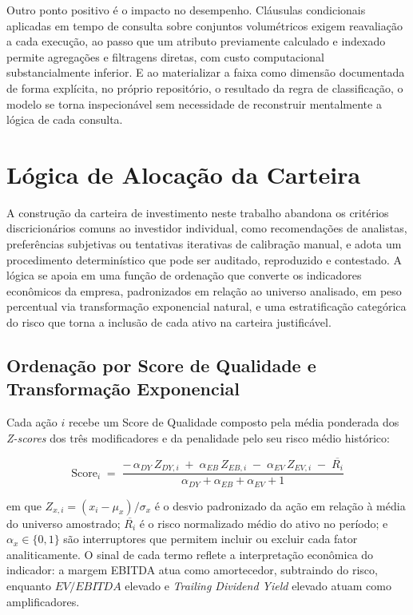 Outro ponto positivo é o impacto no desempenho. Cláusulas condicionais aplicadas em tempo de consulta sobre conjuntos volumétricos exigem reavaliação a cada execução, ao passo que um atributo previamente calculado e indexado permite agregações e filtragens diretas, com custo computacional substancialmente inferior. E ao materializar a faixa como dimensão documentada de forma explícita, no próprio repositório, o resultado da regra de classificação, o modelo se torna inspecionável sem necessidade de reconstruir mentalmente a lógica de cada consulta.

\section{Lógica de Alocação da Carteira}
\label{sec:alocacao-carteira}

A construção da carteira de investimento neste trabalho abandona os critérios discricionários comuns ao investidor individual, como recomendações de analistas, preferências subjetivas ou tentativas iterativas de calibração manual, e adota um procedimento determinístico que pode ser auditado, reproduzido e contestado. A lógica se apoia em uma função de ordenação que converte os indicadores econômicos da empresa, padronizados em relação ao universo analisado, em peso percentual via transformação exponencial natural, e uma estratificação categórica do risco que torna a inclusão de cada ativo na carteira justificável.

\subsection{Ordenação por Score de Qualidade e Transformação Exponencial}
Cada ação $i$ recebe um Score de Qualidade composto pela média ponderada dos \textit{Z-scores} dos três modificadores e da penalidade pelo seu risco médio histórico:

\begin{equation}
\label{eq:score-qualidade}
\text{Score}_i \;=\; \frac{
  -\,\alpha_{DY}\, Z_{DY,i}
  \;+\; \alpha_{EB}\, Z_{EB,i}
  \;-\; \alpha_{EV}\, Z_{EV,i}
  \;-\; \overline{R_i}
}{
  \alpha_{DY} + \alpha_{EB} + \alpha_{EV} + 1
}
\end{equation}

em que $Z_{x,i} = (x_i - \mu_x)/\sigma_x$ é o desvio padronizado da ação em relação à média do universo amostrado; $\overline{R_i}$ é o risco normalizado médio do ativo no período; e $\alpha_x \in \{0, 1\}$ são interruptores que permitem incluir ou excluir cada fator analiticamente. O sinal de cada termo reflete a interpretação econômica do indicador: a margem EBITDA atua como amortecedor, subtraindo do risco, enquanto $EV/EBITDA$ elevado e \textit{Trailing Dividend Yield} elevado atuam como amplificadores.

